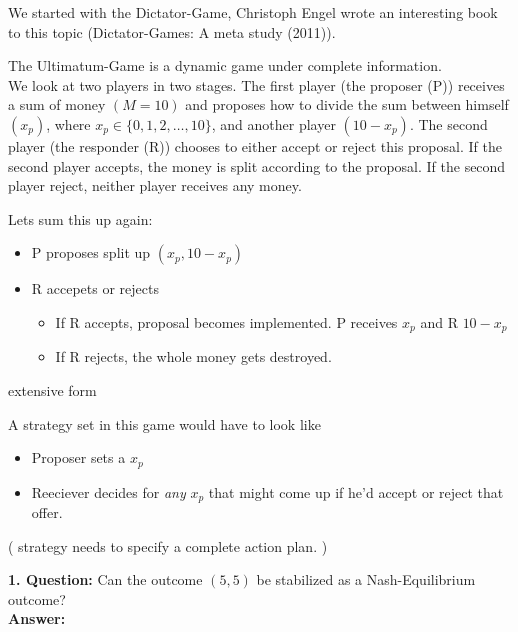 
We started with the Dictator-Game, Christoph Engel wrote an interesting book to this topic (Dictator-Games: A meta study (2011)).

\begin{example}	
The Ultimatum-Game is a dynamic game under complete information. \\
We look at two players in two stages. The first player (the proposer (P)) receives a sum of money $(M = 10)$ and proposes how to divide the sum between himself $(x_{p})$, where $x_{p} \in \{ 0, 1, 2, \dotsc, 10 \}$, and another player $(10 - x_{p})$. The second player (the responder (R)) chooses to either accept or reject this proposal. If the second player accepts, the money is split according to the proposal. If the second player reject, neither player receives any money.

Lets sum this up again:
	\begin{itemize}
		\item P proposes split up $(x_{p}, 10 - x_{p})$
		\item R accepets or rejects
			\begin{itemize}
				\item If R accepts, proposal becomes implemented. P receives $x_{p}$ and R $10 - x_{p}$
				\item If R rejects, the whole money gets destroyed.
			\end{itemize}
	\end{itemize}
	
	extensive form %
	
	A strategy set in this game would have to look like
	\begin{itemize}
		\item Proposer sets a $x_{p}$
		\item Reeciever decides for \textit{any} $x_{p}$ that might come up if he'd accept or reject that offer.
	\end{itemize}
	( strategy needs to specify a complete action plan. )
	
	
	\textbf{1. Question:} Can the outcome $(5, 5)$ be stabilized as a Nash-Equilibrium outcome? \\
	\textbf{Answer:} 

\end{example}

\newpage